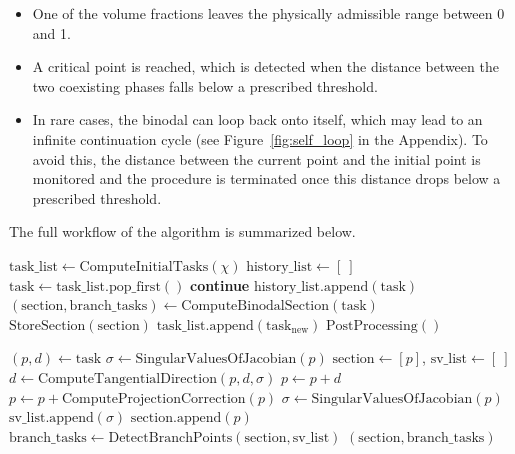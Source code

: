 \documentclass[12pt]{article}
\begin{document}
\begin{terminationbox}
\begin{itemize}
    \item One of the volume fractions leaves the physically admissible range between 0 and 1.
    \item A critical point is reached, which is detected when the distance between the two coexisting phases falls below a prescribed threshold.
    \item In rare cases, the binodal can loop back onto itself, which may lead to an infinite continuation cycle (see Figure~\ref{fig:self_loop} in the Appendix). To avoid this, the distance between the current point and the initial point is monitored and the procedure is terminated once this distance drops below a prescribed threshold.
\end{itemize}
\end{terminationbox}
The full workflow of the algorithm is summarized below.


\begin{tcolorbox}[colback=blue!6,colframe=blue!45!black,arc=2.5mm,title={Pseudocode: Computing the phase diagram},fonttitle=\bfseries]
\begin{algorithmic}[1]
\State $\mathrm{task\_list} \gets \mathrm{ComputeInitialTasks}(\chi)$
\State $\mathrm{history\_list} \gets [\ ]$
    \State $\mathrm{task} \gets \mathrm{task\_list}.\mathrm{pop\_first}()$
        \State \textbf{continue}
    \EndIf
    \State $\mathrm{history\_list}.\mathrm{append}(\mathrm{task})$
    \State $(\mathrm{section}, \mathrm{branch\_tasks}) \gets \mathrm{ComputeBinodalSection}(\mathrm{task})$
    \State $\mathrm{StoreSection}(\mathrm{section})$
        \State $\mathrm{task\_list}.\mathrm{append}(\mathrm{task_{new}})$
    \EndFor
\EndWhile
\State $\mathrm{PostProcessing}()$

\Statex
{}
    \State $(p, d) \gets \mathrm{task}$
    \State $\sigma \gets \mathrm{SingularValuesOfJacobian}(p)$
    \State $\mathrm{section} \gets [p]$, $\mathrm{sv\_list} \gets [\ ]$
        \State $d \gets \mathrm{ComputeTangentialDirection}(p, d, \sigma)$
        \State $p \gets p + d$
            \State $p \gets p + \mathrm{ComputeProjectionCorrection}(p)$
        \EndWhile
        \State $\sigma \gets \mathrm{SingularValuesOfJacobian}(p)$
        \State $\mathrm{sv\_list}.\mathrm{append}(\sigma)$
        \State $\mathrm{section}.\mathrm{append}(p)$
    \EndWhile
    \State $\mathrm{branch\_tasks} \gets \mathrm{DetectBranchPoints}(\mathrm{section}, \mathrm{sv\_list})$
    \State \Return $(\mathrm{section}, \mathrm{branch\_tasks})$
\EndFunction
\end{algorithmic}
\end{tcolorbox}
\end{document}
